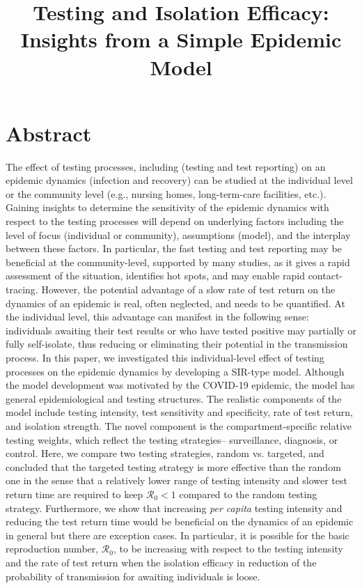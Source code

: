 \documentclass[12pt]{article}
\title{Testing and Isolation Efficacy: Insights from a Simple Epidemic Model}
\newcommand{\percap}{\emph{per capita}\xspace}
\newcommand{\Rnum}{\ensuremath{\mathcal{R}_0}}
\newcommand{\covid}{COVID-19\xspace}
\DeclareRobustCommand\_{\ifmmode\expandafter\subtxt\else\textunderscore\fi}
\theoremstyle{definition} %
\begin{document}
\maketitle

\linenumbers

\section{Abstract}

The effect of testing processes, including (testing and test reporting) on an epidemic dynamics (infection and recovery) can be studied at the individual level or the community level (e.g., nursing homes, long-term-care facilities, etc.). 
Gaining insights to determine the sensitivity of the epidemic dynamics with respect to the testing processes will depend on underlying factors including the level of focus (individual or community), assumptions (model), and the interplay between these factors. 
In particular, the fast testing and test reporting may be beneficial at the community-level, supported by many studies, as it gives a rapid assessment of the situation, identifies hot spots, and may enable rapid contact-tracing. However, the potential advantage of a slow rate of test return on the dynamics of an epidemic is real, often neglected, and needs to be quantified. At the individual level, this advantage can manifest in the following sense: individuals awaiting their test results or who have tested positive may partially or fully self-isolate, thus reducing or eliminating their potential in the transmission process.
In this paper, we investigated this individual-level effect of testing processes on the epidemic dynamics by developing a SIR-type model.
Although the model development was motivated by the \covid epidemic, the model has general epidemiological and testing structures. The realistic components of the model include testing intensity, test sensitivity and specificity, rate of test return, and isolation strength. The novel component is the compartment-specific relative testing weights, which reflect the testing strategies-- surveillance, diagnosis, or control.
Here, we compare two testing strategies, random vs. targeted, and concluded that the targeted testing strategy is more effective than the random one in the sense that a relatively lower range of testing intensity and slower test return time are required to keep $\Rnum <1$ compared to the random testing strategy. Furthermore, we show that increasing \percap testing intensity and reducing the test return time would be beneficial on the dynamics of an epidemic in general but there are exception cases. In particular, it is possible for the basic reproduction number, $\Rnum$, to be increasing with respect to the testing intensity and the rate of test return when the isolation efficacy in reduction of the probability of transmission for awaiting individuals is loose.  
\end{document}
